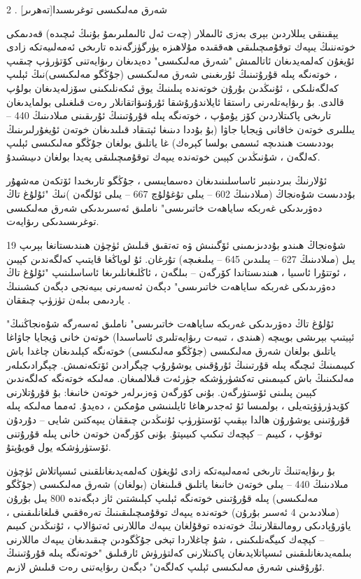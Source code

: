 \documentclass[a4paper]{article}
\begin{document}
2 . شەرق مەلىكىسى توغرىسىدا[تەھرىر]

يېقىنقى يىللاردىن بېرى بەزى ئالىملار (چەت ئەل ئالىملىرىمۇ بۇنىڭ ئىچىدە) قەدىمكى خوتەننىڭ يىپەك توقۇمىچىلىقى ھەققىدە مۇلاھىزە يۈرگۈزگەندە تارىخى ئەمەلىيەتكە زادى ئۇيغۇن كەلمەيدىغان ئاتالمىش "شەرق مەلىكىسى" دەيدىغان رىۋايەتنى كۆتۈرۈپ چىقىپ ، خوتەنگە پىلە قۇرۇتىنىڭ ئۇرىغىنى شەرق مەلىكىسى (جۇڭگو مەلىكىسى)نىڭ ئېلىپ كەلگەنلىكى ، ئۇنىڭدىن بۇرۇن خوتەندە پىلىنىڭ يوق ئىكەنلىكىنى سۆزلەيدىغان بولۇپ قالدى. بۇ رىۋايەتلەرنى راستقا ئايلاندۇرۇشقا ئۇرۇنىۋاتقانلار رەت قىلغىلى بولمايدىغان تارىخى پاكىتلاردىن كۆز يۇمۇپ ، خوتەنگە پىلە قۇرۇتىنىڭ ئۇرىقىنى مىلادىنىڭ 440 – يىللىرى خوتەن خاقانى ۋيجايا جاۋا (بۇ بۇددا دىنىغا ئېتىقاد قىلىدىغان خوتەن ئۇيغۇرلىرىنىڭ بوددىست ھىندىچە ئىسمى بولسا كېرەك) غا ياتلىق بولغان جۇڭگو مەلىكىسى ئېلىپ كەلگەن ، شۇنىڭدىن كېيىن خوتەندە يىپەك توقۇمىچىلىقى پەيدا بولغان دىيىشىدۇ.



ئۇلارنىڭ بىردىنبىر ئاساسلىنىدىغان دەسمايىسى ، جۇڭگو تارىخىدا ئۆتكەن مەشھۇر بۇددىست شۇەنجاڭ (مىلادىنىڭ 602 – يىلى تۇغۇلۇچ 667 – يىلى ئۆلگەن )نىڭ "ئۇلۇغ تاڭ دەۋرىدىكى غەربكە ساياھەت خاتىرىسى" ناملىق ئەسىرىدىكى شەرق مەلىكىسى توغرىسىدىكى رىۋايەت.



شۇەنجاڭ ھىندو بۇددىزىمىنى ئۆگىنىش ۋە تەتقىق قىلىش ئۈچۈن ھىندىستانغا بېرىپ 19 يىل (مىلادىنىڭ 627 – يىلىدىن 645 – يىلىغىچە) تۇرغان. ئۇ لوياڭغا قايتىپ كەلگەندىن كېيىن ، ئوتتۇرا ئاسىيا ، ھىندىستاندا كۆرگەن – بىلگەن ، ئاڭلىغانلىرىغا ئاساسلىنىپ "ئۇلۇغ تاڭ دەۋرىدىكى غەربكە ساياھەت خاتىرىسى" دېگەن ئەسەرنى بىيەنجى دېگەن كىشىنىڭ ياردىمى بىلەن تۈزۈپ چىققان .



"ئۇلۇغ تاڭ دەۋرىدىكى غەربكە ساياھەت خاتىرىسى" ناملىق ئەسەرگە شۇەنجاڭنىڭ ئېيتىپ بېرىشى بويىچە (ھىندى ، تىبەت رىۋايەتلىرى ئاساسىدا) خوتەن خانى ۋيجايا جاۋاغا ياتلىق بولغان شەرق مەلىكىسى (جۇڭگو مەلىكىسى) خوتەنگە كېلىدىغان چاغدا باش كىيىمىنىڭ ئىچىگە پىلە قۇرتىنىڭ ئۇرۇقىنى يوشۇرۇپ چېگرادىن ئۆتكەنمىش. چېگرادىكىلەر مەلىكىنىڭ باش كىيىمىنى تەكشۈرۈشكە جۈرئەت قىلالمىغان. مەلىكە خوتەنگە كەلگەندىن كېيىن پىلىنى ئۆستۈرگەن. بۇنى كۆرگەن ۋەزىرلەر خوتەن خانىغا: بۇ قۇرۇتلارنى كۆيدۈرۈۋېتەيلى ، بولمىسا ئۇ ئەجدىرھاغا ئايلىنىشى مۇمكىن ، دەيدۇ. ئەمما مەلىكە پىلە قۇرۇتىنى يوشۇرۇن ھالدا بېقىپ ئۆستۈرۈپ ئۇنىڭدىن چىققان يىپەكتىن شايى – دۇردۇن توقۇپ ، كىيىم – كېچەك تىكىپ كىيىپتۇ. بۇنى كۆرگەن خوتەن خانى پىلە قۇرۇتنى ئۆستۈرۈشكە يول قويۇپتۇ.



بۇ رىۋايەتنىڭ تارىخى ئەمەلىيەتكە زادى ئۇيغۇن كەلمەيدىغانلقىنى ئىسپاتلاش ئۈچۈن مىلادىنىڭ 440 – يىلى خوتەن خانىغا ياتلىق قىلىنغان (بولغان) شەرق مەلىكىسى (جۇڭگو مەلىكىسى) پىلە قۇرۇتىنى خوتەنگە ئېلىپ كېلىشتىن ئاز دېگەندە 800 يىل بۇرۇن (مىلادىدىن 4 ئەسىر بۇرۇن) خوتەندە يىپەك توقۇمىچىلىقىنىڭ تەرەققىي قىلغانلىقىنى ، ياۋرۇپادىكى رومالىقلارنىڭ خوتەندە توقۇلغان يىپەك ماللارنى ئەتىۋالاپ ، ئۇنىڭدىن كىيىم – كېچەك كىيگەنلىكىنى ، شۇ چاغلاردا تېخى جۇڭگودىن چىقىدىغان يىپەك ماللارنى بىلمەيدىغانلىقىنى ئىسپاتلايدىغان پاكىتلارنى كەلتۈرۈش ئارقىلىق "خوتەنگە پىلە قۇرۇتىنىڭ ئۇرۇقىنى شەرق مەلىكىسى ئېلىپ كەلگەن" دېگەن رىۋايەتنى رەت قىلىش لازىم.
\end{document}
